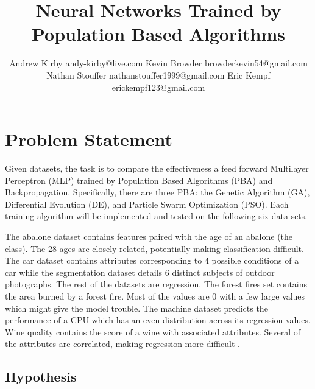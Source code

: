 \documentclass[twoside,11pt]{article}
\begin{document}
\title{Neural Networks Trained by Population Based Algorithms}

\author{\name Andrew Kirby \email andy-kirby@live.com \AND
		\name Kevin Browder \email browderkevin54@gmail.com \AND
		\name Nathan Stouffer \email nathanstouffer1999@gmail.com \AND
		\name Eric Kempf \email erickempf123@gmail.com }

\maketitle

\begin{abstract}

\end{abstract}

\section{Problem Statement}

	Given datasets, the task is to compare the effectiveness a feed forward Multilayer Perceptron (MLP) trained by Population Based Algorithms (PBA) and Backpropagation. Specifically, there are three PBA: the Genetic Algorithm (GA), Differential Evolution (DE), and Particle Swarm Optimization (PSO). 
	Each training algorithm will be implemented and tested on the following six data sets.
		
	The abalone dataset contains features paired with the age of an abalone (the class). The 28 ages are closely related, potentially making classification difficult.
	The car dataset contains attributes corresponding to 4 possible conditions of a car while the segmentation dataset details 6 distinct subjects of outdoor photographs.
	The rest of the datasets are regression.
	The forest fires set contains the area burned by a forest fire. Most of the values are 0 with a few large values which might give the model trouble.
	The machine dataset predicts the performance of a CPU which has an even distribution across its regression values. 
	Wine quality contains the score of a wine with associated attributes. Several of the attributes are correlated, making regression more difficult \citep{datasets}.

\subsection{Hypothesis}
\end{document}
